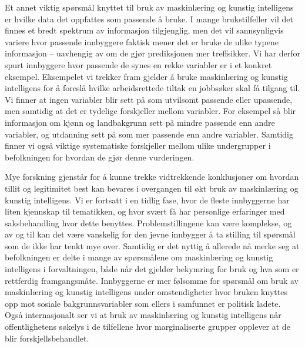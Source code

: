 \documentclass[
  12pt,
  a4paper, 12pt]{article}
\begin{document}
Et annet viktig spørsmål knyttet til bruk av maskinlæring og kunstig intelligens er hvilke data det oppfattes som passende å bruke.
I mange brukstilfeller vil det finnes et bredt spektrum av informasjon tilgjenglig, men det vil sannsynligvis variere hvor passende innbyggere faktisk mener det er bruke de ulike typene informasjon -- uavhengig av om de gjør prediksjonen mer treffsikker.
Vi har derfor spurt innbyggere hvor passende de synes en rekke variabler er i et konkret eksempel.
Eksempelet vi trekker fram gjelder å bruke maskinlæring og kunstig intelligens for å foreslå hvilke arbeidsrettede tiltak en jobbsøker skal få tilgang til.
Vi finner at ingen variabler blir sett på som utvilsomt passende eller upassende, men samtidig at det er tydelige forskjeller mellom variabler.
For eksempel så blir informasjon om kjønn og landbakgrunn sett på mindre passende enn andre variabler, og utdanning sett på som mer passende enn andre variabler.
Samtidig finner vi også viktige systematiske forskjeller mellom ulike undergrupper i befolkningen for hvordan de gjør denne vurderingen.

Mye forskning gjenstår for å kunne trekke vidtrekkende konklusjoner om hvordan tillit og legitimitet best kan bevares i overgangen til økt bruk av maskinlæring og kunstig intelligens.
Vi er fortsatt i en tidlig fase, hvor de fleste innbyggerne har liten kjennskap til tematikken, og hvor svært få har personlige erfaringer med saksbehandling hvor dette benyttes.
Problemstillingene kan være komplekse, og av og til kan det være vanskelig for den jevne innbygger å ta stilling til spørsmål som de ikke har tenkt mye over.
Samtidig er det nyttig å allerede nå merke seg at befolkningen er delte i mange av spørsmålene om maskinlæring og kunstig intelligens i forvaltningen, både når det gjelder bekymring for bruk og hva som er rettferdig framgangsmåte.
Innbyggerne er mer følsomme for spørsmål om bruk av maskinlæring og kunstig intelligens under omstendigheter hvor bruken knyttes opp mot sosiale bakgrunnsvariabler som ellers i samfunnet er politisk ladete.
Også internasjonalt ser vi at bruk av maskinlæring og kunstig intelligens når offentlighetens søkelys i de tilfellene hvor marginaliserte grupper opplever at de blir forskjellsbehandlet.
\end{document}
